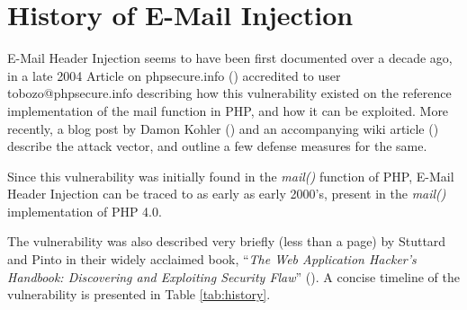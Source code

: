 \section{History of E-Mail Injection}

E-Mail Header Injection seems to have been first documented over a decade ago, in a late 2004 Article on phpsecure.info (\cite{Tobozo}) accredited to user tobozo@phpsecure.info describing how this vulnerability existed on the reference implementation of the mail function in PHP, and how it can be exploited. More recently, a blog post by Damon Kohler (\cite{DK}) and an accompanying wiki article (\cite{Injection}) describe the attack vector, and outline a few defense measures for the same.

Since this vulnerability was initially found in the \emph{mail()} function of PHP, E-Mail Header Injection can be traced to as early as early 2000's, present in the \emph{mail()} implementation of PHP 4.0. 

The vulnerability was also described very briefly (less than a page) by Stuttard and Pinto in their widely acclaimed book, ``\emph{The Web Application Hacker's Handbook: Discovering and Exploiting Security Flaw}'' (\cite{stuttard2011web}). 
A concise timeline of the vulnerability is presented in Table \ref{tab:history}.


